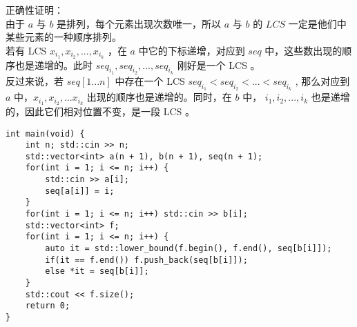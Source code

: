 \documentclass{beamer}
\begin{document}
\begin{frame}
正确性证明：\\
由于 $a$ 与 $b$ 是排列，每个元素出现次数唯一，所以 $a$ 与 $b$ 的 $LCS$ 一定是他们中某些元素的一种顺序排列。 \\ 
若有 LCS $x_{i_{1}},x_{i_{2}},...,x_{i_{k}}$ ，在 $a$ 中它的下标递增，对应到 $seq$ 中，这些数出现的顺序也是递增的。此时 $seq_{i_{1}},seq_{i_{2}},...,seq_{i_{k}}$ 刚好是一个 LCS 。 \\ 
反过来说，若 $seq[1...n]$ 中存在一个 LCS $seq_{i_{1}} < seq_{i_{2}} < ... < seq_{i_{k}}$ , 那么对应到 $a$ 中，$x_{i_{1}},x_{i_{2}},...x_{i_{k}}$ 出现的顺序也是递增的。同时，在 $b$ 中， $i_1, i_2, ... , i_k$ 也是递增的，因此它们相对位置不变，是一段 LCS 。
\end{frame}
\begin{frame}[fragile]
\begin{onlyenv}
\begin{verbatim}
int main(void) {
    int n; std::cin >> n;
    std::vector<int> a(n + 1), b(n + 1), seq(n + 1);
    for(int i = 1; i <= n; i++) {
        std::cin >> a[i];
        seq[a[i]] = i;
    }
    for(int i = 1; i <= n; i++) std::cin >> b[i];
    std::vector<int> f;
    for(int i = 1; i <= n; i++) {
        auto it = std::lower_bound(f.begin(), f.end(), seq[b[i]]);
        if(it == f.end()) f.push_back(seq[b[i]]);
        else *it = seq[b[i]];
    }
    std::cout << f.size();
    return 0;
}
\end{verbatim}
\end{onlyenv}
\end{frame}
\end{document}
